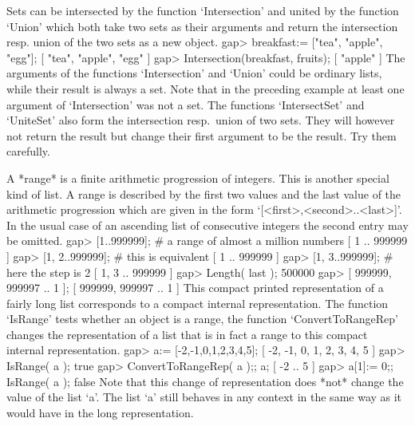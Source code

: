 Sets can be intersected by the function `Intersection'  and united by the
function `Union' which both take  two sets as their arguments  and return
the intersection resp. union of the two sets as a new object.
\beginexample
gap> breakfast:= ["tea", "apple", "egg"];
[ "tea", "apple", "egg" ]
gap> Intersection(breakfast, fruits);
[ "apple" ]
\endexample
The  arguments  of the functions  `Intersection'  and `Union' could be
ordinary lists, while their  result is always  a set. Note that in the
preceding  example at least one  argument of  `Intersection' was not a
set.   The functions   `IntersectSet' and  `UniteSet'   also form  the
intersection resp.~union of two sets. They will however not return the
result  but change their  first argument  to be  the result.  Try them
carefully.


A *range* is a finite arithmetic progression of integers. This is another
special kind of list. A range is described by the first two values and the last
value of the arithmetic progression which are given in the form
`[<first>,<second>..<last>]'.
In the usual case of an ascending list of
consecutive integers the second entry may be omitted.
\beginexample
gap> [1..999999];     #  a range of almost a million numbers
[ 1 .. 999999 ]
gap> [1, 2..999999];  #  this is equivalent
[ 1 .. 999999 ]
gap> [1, 3..999999];  #  here the step is 2
[ 1, 3 .. 999999 ]
gap> Length( last );
500000
gap> [ 999999, 999997 .. 1 ];
[ 999999, 999997 .. 1 ]
\endexample
This compact printed representation of a fairly long  list corresponds to
a  compact internal representation.
The function `IsRange' tests whether an object is a range,
the function `ConvertToRangeRep' changes the representation of a list
that is in fact a range to this compact internal representation.
\beginexample
gap> a:= [-2,-1,0,1,2,3,4,5];
[ -2, -1, 0, 1, 2, 3, 4, 5 ]
gap> IsRange( a );
true
gap> ConvertToRangeRep( a );;  a;
[ -2 .. 5 ]
gap> a[1]:= 0;; IsRange( a );
false
\endexample
Note that this  change of representation does  *not* change the  value of
the list `a'. The list `a'  still behaves in any context  in the same way
as it would have in the long representation.




